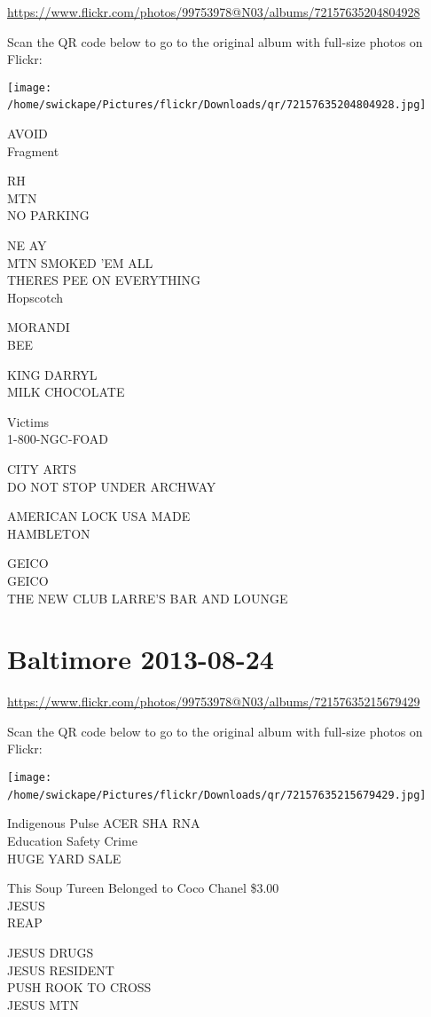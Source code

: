 \documentclass[10pt,letterpaper]{article}
\begin{document}
\url{https://www.flickr.com/photos/99753978@N03/albums/72157635204804928}

Scan the QR code below to go to the original album with full-size photos on Flickr:

\texttt{[image: /home/swickape/Pictures/flickr/Downloads/qr/72157635204804928.jpg]}
\

AVOID\\
Fragment

RH\\
MTN\\
NO PARKING

NE AY\\
MTN SMOKED 'EM ALL\\
THERES PEE ON EVERYTHING\\
Hopscotch

MORANDI\\
BEE

KING DARRYL\\
MILK CHOCOLATE

Victims\\
1{-}800{-}NGC{-}FOAD

CITY ARTS\\
DO NOT STOP UNDER ARCHWAY

AMERICAN LOCK USA MADE\\
HAMBLETON

GEICO\\
GEICO\\
THE NEW CLUB LARRE'S BAR AND LOUNGE
\

\section*{Baltimore 2013-08-24}

\url{https://www.flickr.com/photos/99753978@N03/albums/72157635215679429}

Scan the QR code below to go to the original album with full-size photos on Flickr:

\texttt{[image: /home/swickape/Pictures/flickr/Downloads/qr/72157635215679429.jpg]}
\

Indigenous Pulse ACER SHA RNA\\
Education Safety Crime\\
HUGE YARD SALE

This Soup Tureen Belonged to Coco Chanel \$3.00\\
JESUS\\
REAP

JESUS DRUGS\\
JESUS RESIDENT\\
PUSH ROOK TO CROSS\\
JESUS MTN
\end{document}
